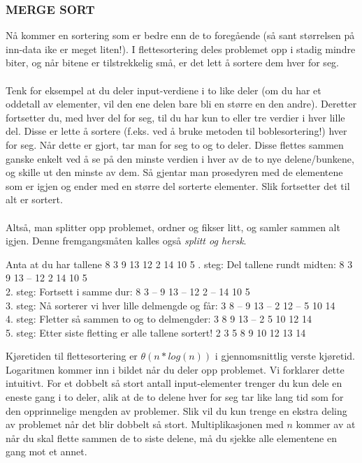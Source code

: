 \subsubsection{MERGE SORT}
Nå kommer en sortering som er bedre enn de to foregående (så sant størrelsen på inn-data ike er meget liten!). I flettesortering deles problemet opp i stadig mindre biter, og når bitene er tilstrekkelig små, er det lett å sortere dem hver for seg.
\\\\
Tenk for eksempel at du deler input-verdiene i to like deler (om du har et oddetall av elementer, vil den ene delen bare bli en større en den andre). Deretter fortsetter du, med hver del for seg, til du har kun to eller tre verdier i hver lille del. Disse er lette å sortere (f.eks. ved å bruke metoden til boblesortering!) hver for seg. Når dette er gjort, tar man for seg to og to deler. Disse flettes sammen ganske enkelt ved å se på den minste verdien i hver av de to nye delene/bunkene, og skille ut den minste av dem. Så gjentar man prosedyren med de elementene som er igjen og ender med en større del sorterte elementer. Slik fortsetter det til alt er sortert.
\\\\
Altså, man splitter opp problemet, ordner og fikser litt, og samler sammen alt igjen. Denne fremgangsmåten kalles også \textit{splitt og hersk}.

\begin{boxed}
Anta at du har tallene 8 3 9 13 12 2 14 10 5
\newline {}. steg: Del tallene rundt midten:  \hfill 8 3 9 13 – 12 2 14 10 5\\
2. steg: Fortsett i samme dur:  \hfill 8 3 – 9 13 – 12 2 – 14 10 5\\
3. steg: Nå sorterer vi hver lille delmengde og får:   \hfill 3 8 – 9 13 – 2 12 – 5 10 14\\
4. steg: Fletter så sammen to og to delmengder: \hfill 3 8 9 13 – 2 5 10 12 14\\
5. steg: Etter siste fletting er alle tallene sortert!    \hfill 2 3 5 8 9 10 12 13 14
\end{boxed}

\noindent Kjøretiden til flettesortering er \textbf{$\theta(n*log(n))$} i gjennomsnittlig verste kjøretid. Logaritmen kommer inn i bildet når du deler opp problemet. Vi forklarer dette intuitivt. For et dobbelt så stort antall input-elementer trenger du kun dele en eneste gang i to deler, alik at de to delene hver for seg tar like lang tid som for den opprinnelige mengden av problemer. Slik vil du kun trenge en ekstra deling av problemet når det blir dobbelt så stort. Multiplikasjonen med $n$ kommer av at når du skal flette sammen de to siste delene, må du sjekke alle elementene en gang mot et annet.

